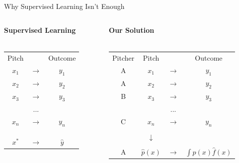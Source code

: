 \documentclass{beamer}
\begin{document}
  \begin{frame}{Why Supervised Learning Isn't Enough}
    \begin{columns}
      \begin{column}{0.4\columnwidth}
        \centering
        {\bf Supervised Learning}\\
        ~\\
        \begin{tabular}{ccc}
          Pitch &               & Outcome\\
          $x_1$ & $\rightarrow$ & $y_1$\\
          $x_2$ & $\rightarrow$ & $y_2$\\
          $x_3$ & $\rightarrow$ & $y_3$\\
                & ...           &      \\
          $x_n$ & $\rightarrow$ & $y_n$\\
          \\
          \\
          \\
          $x^*$ & $\rightarrow$ & $\hat y$\\
        \end{tabular}
      \end{column}
      \begin{column}{0.6\columnwidth}
        \centering
        {\bf \color{ricerichblue} Our Solution}\\
        ~\\
        \begin{tabular}{cccc}
          Pitcher & Pitch &               & Outcome\\
          A       & $x_1$ & $\rightarrow$ & $y_1$\\
          A       & $x_2$ & $\rightarrow$ & $y_2$\\
          B       & $x_3$ & $\rightarrow$ & $y_3$\\
                  &       & ...           &      \\
          C       & $x_n$ & $\rightarrow$ & $y_n$\\
                  & \\
                  & {\color{ricerichblue}$\downarrow$}\\
                  & \\
          A       & {\color{ricerichblue} $\hat p(x)$} & {\color{ricerichblue}$\rightarrow$} & {\color{ricerichblue} $\int\hat p(x)\hat f(x)$}\\
        \end{tabular}
      \end{column}
    \end{columns}
  \end{frame}
\end{document}
